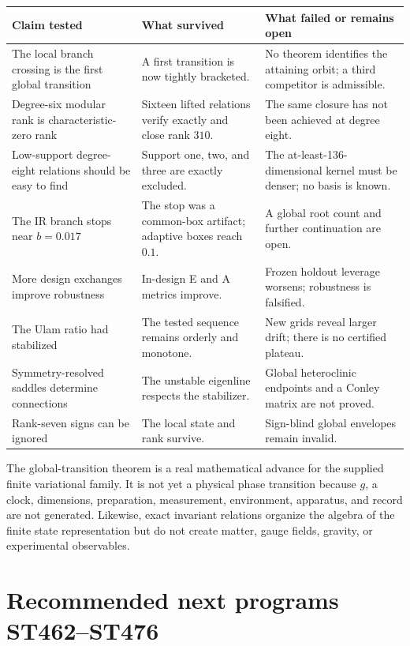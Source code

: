 \documentclass[11pt,a4paper]{article}
\begin{document}
\begin{longtable}{>{\raggedright\arraybackslash}p{}>{\raggedright\arraybackslash}p{}>{\raggedright\arraybackslash}p{}}
\toprule Claim tested&What survived&What failed or remains open\\\midrule\endhead
The local branch crossing is the first global transition&A first transition is now tightly bracketed.&No theorem identifies the attaining orbit; a third competitor is admissible.\\
Degree-six modular rank is characteristic-zero rank&Sixteen lifted relations verify exactly and close rank $310$.&The same closure has not been achieved at degree eight.\\
Low-support degree-eight relations should be easy to find&Support one, two, and three are exactly excluded.&The at-least-136-dimensional kernel must be denser; no basis is known.\\
The IR branch stops near $b=0.017$&The stop was a common-box artifact; adaptive boxes reach $0.1$.&A global root count and further continuation are open.\\
More design exchanges improve robustness&In-design E and A metrics improve.&Frozen holdout leverage worsens; robustness is falsified.\\
The Ulam ratio had stabilized&The tested sequence remains orderly and monotone.&New grids reveal larger drift; there is no certified plateau.\\
Symmetry-resolved saddles determine connections&The unstable eigenline respects the stabilizer.&Global heteroclinic endpoints and a Conley matrix are not proved.\\
Rank-seven signs can be ignored&The local state and rank survive.&Sign-blind global envelopes remain invalid.\\
\bottomrule
\end{longtable}

The global-transition theorem is a real mathematical advance for the supplied
finite variational family.  It is not yet a physical phase transition because
$g$, a clock, dimensions, preparation, measurement, environment, apparatus,
and record are not generated.  Likewise, exact invariant relations organize
the algebra of the finite state representation but do not create matter,
gauge fields, gravity, or experimental observables.

\section{Recommended next programs ST462--ST476}
\end{document}
